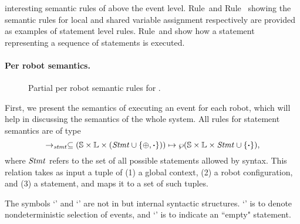 %
interesting semantic rules of \lgname above the event level. Rule~\LVarUpdate and Rule ~\SVarUpdate showing the semantic rules for local and shared variable assignment respectively are provided as examples of statement level rules. Rule~\StmtSeqRuleOne and \StmtSeqRuleTwo show how a statement representing a sequence of statements is executed.


\paragraph{Per robot semantics.}

\begin{figure}
    \centering
    \begin{minipage}{0.8\linewidth}
    \scriptsize

\caption{\small Partial per robot semantic rules for \lgname.}\label{fig:partial-semantics}
\end{minipage}
\end{figure}

First, we present the semantics of executing an event for each robot,
which will help in discussing the semantics of the whole system.
All rules for statement semantics are of type
\[
\rightarrow_\mathit{stmt} \subseteq (\mathbb{S} \times \mathbb{L}\times (\mathit{Stmt} \cup \{\mathtt{\oplus}, \mathtt{\boldsymbol{\cdot}}\})) \mapsto \wp(\mathbb{S}\times \mathbb{L} \times \mathit{Stmt}\cup \{\mathtt{\boldsymbol{\cdot}}\}),
\]
where $\mathit{Stmt}$ refers to the set of all possible statements allowed by \lgname syntax.
This relation takes as input a tuple of (1) a global context, (2) a robot configuration, and (3) a statement,
and maps it to a set of such tuples.



The symbols `\SelectEvent' and `\EndEvent' are not in \lgname but internal syntactic structures.
`\SelectEvent' is to denote nondeterministic selection of events,
and `\EndEvent' is to indicate an ``empty" statement.


